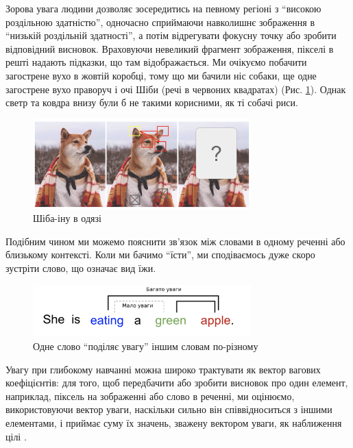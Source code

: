 \documentclass[a4paper,14pt]{extreport}
\begin{document}
Зорова увага людини дозволяє зосередитись на певному регіоні з
``високою роздільною здатністю'', одночасно сприймаючи навколишнє
зображення в ``низькій роздільній здатності'', а потім відрегувати
фокусну точку або зробити відповідний висновок.
Враховуючи невеликий фрагмент зображення, пікселі в решті надають підказки, що
там відображається. Ми очікуємо побачити загострене вухо в жовтій коробці,
тому що ми бачили ніс собаки, ще одне загострене вухо праворуч і очі
Шіби (речі в червоних квадратах) (Рис. \ref{fig:shiba}). Однак
светр та ковдра внизу були
б не такими корисними, як ті собачі риси.

\begin{figure}[H]
    \centering
    \includegraphics[width=0.75\textwidth]{shiba-example-attention.png}
    \caption{Шіба-іну в одязі}
    \label{fig:shiba}
\end{figure}

Подібним чином ми можемо пояснити зв'язок між словами в одному реченні
або близькому контексті. Коли ми бачимо ``їсти'', ми сподіваємось дуже
скоро зустріти слово, що означає вид їжи.

\begin{figure}[H]
    \centering
    \includegraphics[width=0.75\textwidth]{sentence-example-attention.png}
    \caption{Одне слово ``поділяє увагу'' іншим словам по-різному}
    \label{fig:attend-example}
\end{figure}

Увагу при глибокому навчанні можна широко трактувати як вектор вагових
коефіцієнтів: для того, щоб передбачити або зробити висновок про один елемент,
наприклад, піксель на зображенні або слово в реченні, ми оцінюємо,
використовуючи вектор уваги, наскільки сильно він співвідноситься з іншими
елементами,
і приймає суму їх значень, зважену вектором уваги, як наближення
цілі \cite{attention}.
\end{document}
